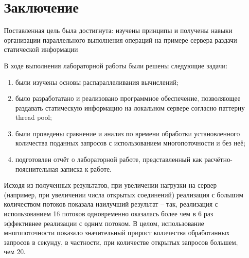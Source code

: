 \chapter*{Заключение}

Поставленная цель была достигнута: изучены принципы и получены навыки организации параллельного выполнения операций на примере сервера раздачи статической информации

В ходе выполнения лабораторной работы были решены следующие задачи:

\begin{enumerate}[label=\arabic*)]
	\item были изучены основы распараллеливания вычислений;
	\item было разработатано и реализовано программное обеспечение, позволяющее раздавать статическую информацию на локальном сервере согласно паттерну thread pool;
	\item были проведены сравнение и анализ по времени обработки установленного количества поданных запросов с использованием многопоточности и без неё;
	\item подготовлен отчёт о лабораторной работе, представленный как расчётно-пояснительная записка к работе.
\end{enumerate}

Исходя из полученных результатов, при увеличении нагрузки на сервер (например, при увеличении числа открытых соединений) реализация с большим количеством потоков показала наилучший результат -- так, реализация с использованием 16 потоков одновременно оказалась более чем в 6 раз эффективнее реализации с одним потоком.
В целом, использование многопоточности показало значительный прирост количества обработанных запросов в секунду, в частности, при количестве открытых запросов большем, чем 20.

